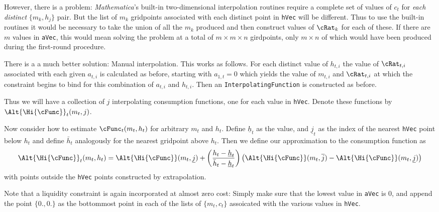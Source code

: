 \documentclass[titlepage]{\econtex}
\newcommand{\Mma}{\textit{Mathematica}}
\begin{document}
{  However, there is a problem: {\Mma}'s built-in two-dimensional
  interpolation routines require a complete set of values of ${c}_{t}$
  for \textit{each distinct} $\{{m}_{k},h_{j}\}$ pair.  But the list of
  ${m}_{k}$ gridpoints associated with each distinct point in
  \texttt{hVec} will be different.  Thus to use the built-in routines
  it would be necessary to take the union of all the ${m}_{k}$
  produced and then construct values of ${\cRat}_{k}$ for each of
  these.  If there are $m$ values in \texttt{aVec}, this would
  mean solving the problem at a total of $m \times m \times n$
  girdpoints, only $m \times n$ of which would have been produced
  during the first-round procedure.

  There is a a much better solution: Manual interpolation.  This works
  as follows.  For each distinct value of $h_{t,i}$ the value of
  ${\cRat}_{t,i}$ associated with each given ${a}_{t,i}$ is
  calculated as before, starting with ${a}_{1,t}=0$ which yields
  the value of ${m}_{t,i}$ and ${\cRat}_{t,i}$ at which the
  constraint begins to bind for this combination of ${a}_{t,i}$
  and $h_{t,i}$.  Then an \texttt{InterpolatingFunction} is
  constructed as before.

  Thus we will have a collection of $j$ interpolating consumption
  functions, one for each value in \texttt{hVec}.  Denote these
  functions by $\Alt{\Hi{\cFunc}}_{t}({m}_{t},j)$.

  Now consider how to estimate $\cFunc_{t}({m}_{t},h_{t})$ for arbitrary
  ${m}_{t}$ and $h_{t}$.  Define $\underline{h}_{t}$ as the value, and
  $\underline{j}_{t}$ as the index of the nearest \texttt{hVec} point
  below $h_{t}$ and define $\bar{h}_{t}$ analogously for the nearest
  gridpoint above $h_{t}$.  Then we define our approximation to the
  consumption function as
  \begin{displaymath}
    \Alt{\Hi{\cFunc}}_{t}({m}_{t},h_{t}) =
    \Alt{\Hi{\cFunc}}({m}_{t},\underline{j})+\left(\frac{h_{t}-\underline{h}_{t}}
      {\bar{h}_{t}-\underline{h}_{t}}\right)
    \left(\Alt{\Hi{\cFunc}}({m}_{t},\overline{j})
      -\Alt{\Hi{\cFunc}}({m}_{t},\underline{j})\right)
  \end{displaymath}
  with points outside the \texttt{hVec} points constructed by
  extrapolation.

  Note that a liquidity constraint is again incorporated at almost
  zero cost: Simply make sure that the lowest value in
  \texttt{aVec} is 0, and append the point $\{0.,0.\}$ as the
  bottommost point in each of the lists of $\{{m}_{t},{c}_{t}\}$
  assoicated with the various values in \texttt{hVec}.

}
\end{document}
